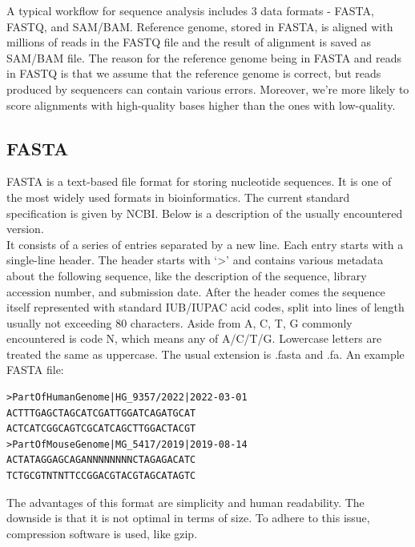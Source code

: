 A typical workflow for sequence analysis includes $3$ data formats - FASTA, FASTQ, and SAM/BAM. Reference genome, stored in FASTA, is aligned with millions of reads in the FASTQ file and the result of alignment is saved as SAM/BAM file. The reason for the reference genome being in FASTA and reads in FASTQ is that we assume that the reference genome is correct, but reads produced by sequencers can contain various errors. Moreover, we’re more likely to score alignments with high-quality bases higher than the ones with low-quality.

\subsection{FASTA}

FASTA is a text-based file format for storing nucleotide sequences. It is one of the most widely used formats in bioinformatics. The current standard specification is given by NCBI. Below is a description of the usually encountered version. \\

\noindent It consists of a series of entries separated by a new line. Each entry starts with a single-line header. The header starts with ‘>’ and contains various metadata about the following sequence, like the description of the sequence, library accession number, and submission date. After the header comes the sequence itself represented with standard IUB/IUPAC acid codes, split into lines of length usually not exceeding $80$ characters. Aside from A, C, T, G commonly encountered is code N, which means any of A/C/T/G. Lowercase letters are treated the same as uppercase. The usual extension is .fasta and .fa. An example FASTA file:

\begin{verbatim}
>PartOfHumanGenome|HG_9357/2022|2022-03-01
ACTTTGAGCTAGCATCGATTGGATCAGATGCAT
ACTCATCGGCAGTCGCATCAGCTTGGACTACGT
>PartOfMouseGenome|MG_5417/2019|2019-08-14
ACTATAGGAGCAGANNNNNNNNCTAGAGACATC
TCTGCGTNTNTTCCGGACGTACGTAGCATAGTC
\end{verbatim}

\noindent The advantages of this format are simplicity and human readability. The downside is that it is not optimal in terms of size. To adhere to this issue, compression software is used, like gzip.


